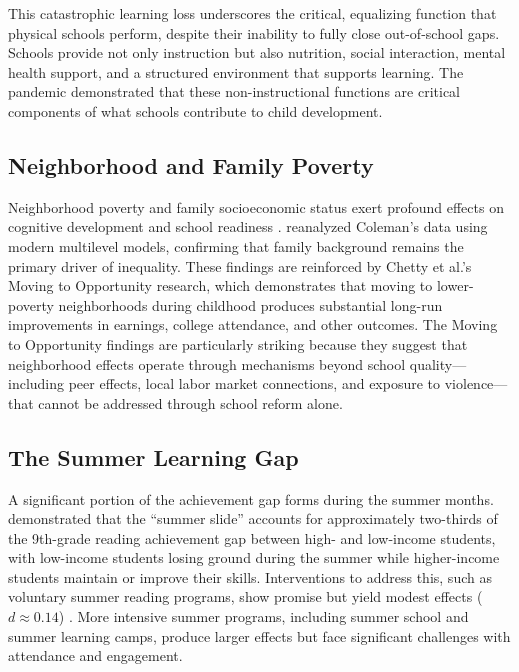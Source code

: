\documentclass[12pt,letterpaper]{article}
\begin{document}
This catastrophic learning loss underscores the critical, equalizing function that physical schools perform, despite their inability to fully close out-of-school gaps. Schools provide not only instruction but also nutrition, social interaction, mental health support, and a structured environment that supports learning. The pandemic demonstrated that these non-instructional functions are critical components of what schools contribute to child development.

\subsection{Neighborhood and Family Poverty}

Neighborhood poverty and family socioeconomic status exert profound effects on cognitive development and school readiness \citep{wolf2017}. \citet{borman2010} reanalyzed Coleman's data using modern multilevel models, confirming that family background remains the primary driver of inequality. These findings are reinforced by Chetty et al.'s Moving to Opportunity research, which demonstrates that moving to lower-poverty neighborhoods during childhood produces substantial long-run improvements in earnings, college attendance, and other outcomes. The Moving to Opportunity findings are particularly striking because they suggest that neighborhood effects operate through mechanisms beyond school quality---including peer effects, local labor market connections, and exposure to violence---that cannot be addressed through school reform alone.

\subsection{The Summer Learning Gap}

A significant portion of the achievement gap forms during the summer months. \citet{alexander2007} demonstrated that the ``summer slide'' accounts for approximately two-thirds of the 9th-grade reading achievement gap between high- and low-income students, with low-income students losing ground during the summer while higher-income students maintain or improve their skills. Interventions to address this, such as voluntary summer reading programs, show promise but yield modest effects ($d \approx 0.14$) \citep{kim2006}. More intensive summer programs, including summer school and summer learning camps, produce larger effects but face significant challenges with attendance and engagement.
\end{document}
